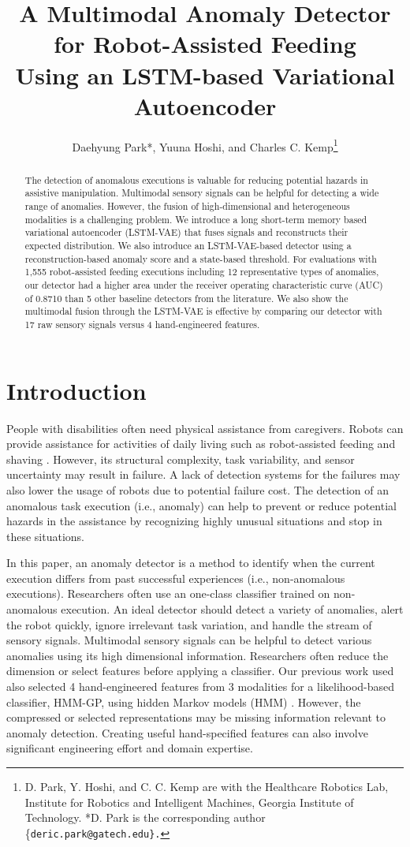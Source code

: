 \documentclass[letterpaper, 10 pt, conference]{ieeeconf}
\title{A Multimodal Anomaly Detector for Robot-Assisted Feeding \\Using an LSTM-based Variational Autoencoder}
\author{Daehyung Park*, Yuuna Hoshi, and Charles C. Kemp\thanks{D. Park, Y. Hoshi, and C. C. Kemp are with the Healthcare Robotics Lab, Institute for Robotics and Intelligent Machines, Georgia Institute of Technology. *D. Park is the corresponding author
\{\tt\small deric.park@gatech.edu\}.}
}
\begin{document}
\maketitle
\thispagestyle{empty}
\pagestyle{empty}

\begin{abstract}
The detection of anomalous executions is valuable for reducing potential hazards in assistive manipulation. Multimodal sensory signals can be helpful for detecting a wide range of anomalies. However, the fusion of high-dimensional and heterogeneous modalities is a challenging problem. We introduce a long short-term memory based variational autoencoder (LSTM-VAE) that fuses signals and reconstructs their expected distribution. We also introduce an LSTM-VAE-based detector using a reconstruction-based anomaly score and a state-based threshold. For evaluations with 1,555 robot-assisted feeding executions including 12 representative types of anomalies, our detector had a higher area under the receiver operating characteristic curve (AUC) of 0.8710 than 5 other baseline detectors from the literature. We also show the multimodal fusion through the LSTM-VAE is effective by comparing our detector with 17 raw sensory signals versus 4 hand-engineered features. 
\end{abstract}


\section{Introduction}
People with disabilities often need physical assistance from caregivers. Robots can provide assistance for activities of daily living such as robot-assisted feeding \cite{park2016towards} and shaving \cite{chen2013robots}. However, its structural complexity, task variability, and sensor uncertainty may result in failure. A lack of detection systems for the failures may also lower the usage of robots due to potential failure cost. The detection of an anomalous task execution (i.e., anomaly) can help to prevent or reduce potential hazards in the assistance by recognizing highly unusual situations and stop in these situations. 

In this paper, an anomaly detector is a method to identify when the current execution differs from past successful experiences (i.e., non-anomalous executions). Researchers often use an one-class classifier trained on non-anomalous execution. An ideal detector should detect a variety of anomalies, alert the robot quickly, ignore irrelevant task variation, and handle the stream of sensory signals. Multimodal sensory signals can be helpful to detect various anomalies using its high dimensional information. Researchers often reduce the dimension or select features before applying a classifier. Our previous work used also selected 4 hand-engineered features from 3 modalities for a likelihood-based classifier, HMM-GP, using hidden Markov models (HMM) \cite{park2016multimodal,park2017class}. However, the compressed or selected representations may be missing information relevant to anomaly detection. Creating useful hand-specified features can also involve significant engineering effort and domain expertise.
\end{document}

